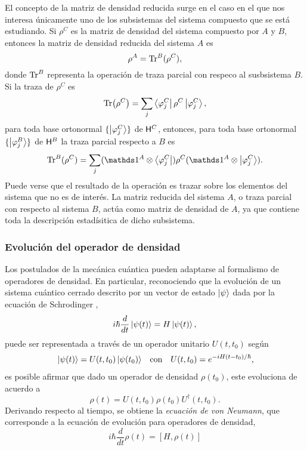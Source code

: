 El concepto de la matriz de densidad reducida surge en el caso en el que nos interesa únicamente uno de los subsistemas del sistema compuesto que se está estudiando. Si $\rho^{C}$ es la matriz de densidad del sistema compuesto por $A$ y $B$, entonces la matriz de densidad reducida del sistema $A$ es
\begin{equation*}
    \rho^{A}=\Tr^{B}(\rho^{C}),
\end{equation*}
donde $\Tr^{B}$ representa la operación de traza parcial con respeco al susbsistema $B$. Si la traza de $\rho^{C}$ es 
\begin{equation*}
    \Tr(\rho^{C})=\sum_{j}\bra{\varphi^{C}_{j}}\rho^{C}\ket{\varphi^{C}_{j}},
\end{equation*}
para toda base ortonormal $\{\ket{\varphi^{C}_{j}}\}$ de ${\sf H}^{C}$, entonces, para toda base ortonormal $\{\ket{\varphi^{B}_{j}}\}$ de ${\sf H}^{B}$  la traza parcial respecto a $B$ es
\begin{equation*}
    \Tr^{B}(\rho^{C})=\sum_{j}(\Id^{A}\otimes \bra{\varphi^{C}_{j}})\rho^{C}(\Id^{A}\otimes \ket{\varphi^{C}_{j}}).
\end{equation*}
Puede verse que el resultado de la operación es trazar sobre los elementos del sistema que no es de interés. La matriz reducida del sistema $A$, o traza parcial con respecto al sistema $B$, actúa como matriz de densidad de $A$, ya que contiene toda la descripción estadísitica de dicho subsistema.
\subsubsection{Evolución del operador de densidad}
Los postulados de la mecánica cuántica pueden adaptarse al formalismo de operadores de densidad. En particular, reconociendo que la evolución de un sistema cuántico cerrado descrito por un vector de estado $\ket{\psi}$ dada por la ecuación de Schrodinger \cite{Breuer},
\begin{equation*}
    i\hbar\frac{d}{dt}\ket{\psi(t)}=H\ket{\psi(t)},
\end{equation*}
puede ser representada a través de un operador unitario $U(t,t_{0})$ según
\begin{align*}
    \ket{\psi(t)}=U(t,t_{0})\ket{\psi(t_{0})} && \text{con} && U(t,t_{0})=e^{-iH(t-t_{0})/\hbar}\rlap{,}
\end{align*}
es posible afirmar que dado un operador de densidad $\rho(t_{0})$, este evoluciona de acuerdo a
\begin{equation*}
    \rho(t)=U(t,t_{0})\rho(t_{0})U^{\dagger}(t,t_{0}).
\end{equation*}
Derivando respecto al tiempo, se obtiene la \textit{ecuación de von Neumann}, que corresponde a la ecuación de evolución para operadores de densidad,
\begin{equation}\label{eq:vonNeumann}
    i\hbar\frac{d}{d t} \rho(t)=[H,\rho(t)]
\end{equation}
